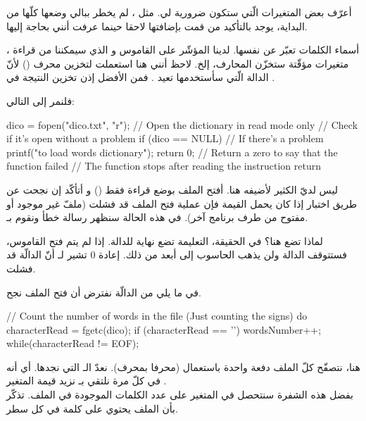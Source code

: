 أعرّف بعض المتغيرات الّتي ستكون ضرورية لي. مثل ،
لم يخطر ببالي وضعها كلّها من البداية، يوجد بالتأكيد من قمت بإضافتها لاحقا حينما عرفت أنني بحاجة إليها.

أسماء الكلمات تعبّر عن نفسها. لدينا المؤشّر على القاموس
و الذي سيمكننا من قراءة
،
متغيرات مؤقّتة ستخزّن المحارف، إلخ.
لاحظ أنني هنا استعملت
لتخزين محرف
()
لأنّ الدالة
الّتي سأستخدمها تعيد
.
فمن الأفضل إذن تخزين النتيجة في
.

فلنمر إلى التالي:

\begin{Csource}
dico = fopen("dico.txt", "r"); // Open the dictionary in read mode only
// Check if it's open without a problem
if (dico == NULL) // If there's a problem
{
  printf("\nImpossible to load words dictionary");
  return 0; // Return a zero to say that the function failed
  // The function stops after reading the instruction return
}
\end{Csource}

ليس لديّ الكثير لأضيفه هنا. أفتح الملف
بوضع قراءة فقط
()
و أتأكّد إن نجحت عن طريق اختبار إذا كان
يحمل القيمة
فإن عملية فتح الملف قد فشلت (ملفّ غير موجود أو مفتوح من طرف برنامج آخر). في هذه الحالة سنظهر رسالة خطأ ونقوم بـ.

لماذا تضع
هنا؟ في الحقيقة، التعليمة
تضع نهاية للدالة. إذا لم يتم فتح القاموس، فستتوقف الدالة ولن يذهب الحاسوب إلى أبعد من ذلك. إعادة 0 تشير لـ
أنّ الدالّة قد فشلت.

في ما يلي من الدالّة نفترض أن فتح الملف نجح.

\begin{Csource}
// Count the number of words in the file (Just counting the \n signs)
do
{
  characterRead = fgetc(dico);
  if (characterRead == '\n')
    wordsNumber++;
} while(characterRead != EOF);
\end{Csource}

هنا، نتصفّح كلّ الملف دفعة واحدة باستعمال
(محرفا بمحرف). نعدّ الـ
التي نجدها. أي أنه في كلّ مرة نلتقي بـ
نزيد قيمة المتغير
.\\
بفضل هذه الشفرة سنتحصل في المتغير
على عدد الكلمات الموجودة في الملف. تذكّر بأن الملف يحتوي على كلمة في كل سطر.

